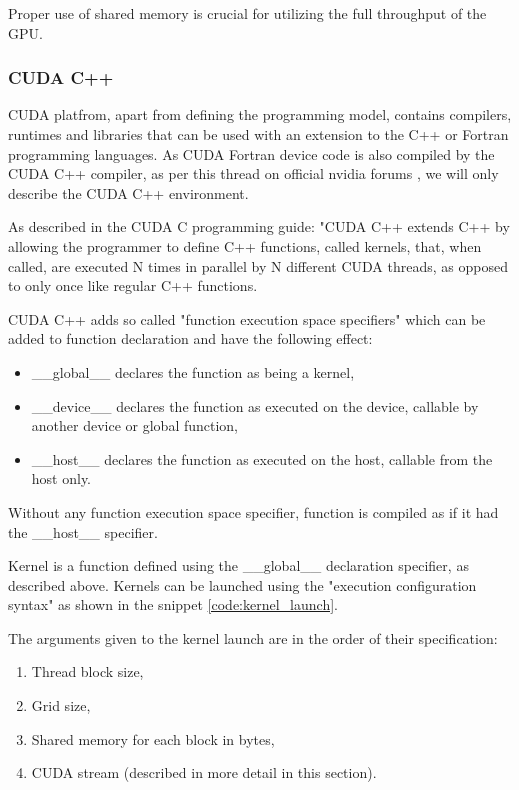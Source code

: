 Proper use of shared memory is crucial for utilizing the full throughput of the GPU.

\subsubsection{CUDA C++}
\label{sec:cuda_cpp}
CUDA platfrom, apart from defining the programming model, contains compilers, runtimes and libraries that can be used with an extension to the C++ or Fortran programming languages. As CUDA Fortran device code is also compiled by the CUDA C++ compiler, as per this thread on official nvidia forums %
, we will only describe the CUDA C++ environment.

As described in the CUDA C programming guide: "CUDA C++ extends C++ by allowing the programmer to define C++ functions, called kernels, that, when called, are executed N times in parallel by N different CUDA threads, as opposed to only once like regular C++ functions. %

CUDA C++ adds so called "function execution space specifiers" which can be added to function declaration and have the following effect:
\begin{itemize}
	\item \_\_global\_\_ declares the function as being a kernel,
	\item \_\_device\_\_ declares the function as executed on the device, callable by another device or global function,
	\item \_\_host\_\_ declares the function as executed on the host, callable from the host only.
\end{itemize}

Without any function execution space specifier, function is compiled as if it had the \_\_host\_\_ specifier.

Kernel is a function defined using the \_\_global\_\_ declaration specifier, as described above. Kernels can be launched using the "execution configuration syntax" as shown in the snippet \ref{code:kernel_launch}.




The arguments given to the kernel launch are in the order of their specification:

\begin{enumerate}
	\item Thread block size,
	\item Grid size,
	\item Shared memory for each block in bytes,
	\item CUDA stream (described in more detail in this section).
\end{enumerate}

